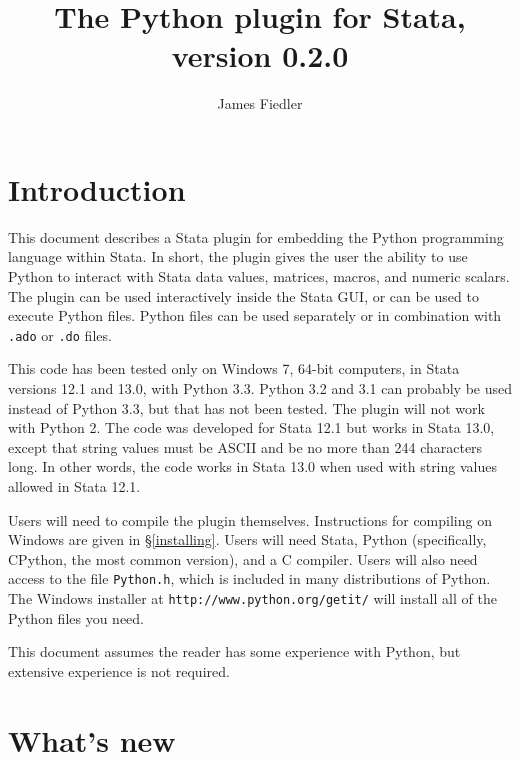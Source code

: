 \documentclass{article}
\title{The Python plugin for Stata, version 0.2.0}
\author{James Fiedler}
\begin{document}
\maketitle
\tableofcontents

\section{Introduction}
		
This document describes a Stata plugin for embedding the Python programming language within Stata. In short, the plugin gives the user the ability to use Python to interact with Stata data values, matrices, macros, and numeric scalars. The plugin can be used interactively inside the Stata GUI, or can be used to execute Python files. Python files can be used separately or in combination with \lstinline{.ado} or \lstinline{.do} files.
		
This code has been tested only on Windows 7, 64-bit computers, in Stata versions 12.1 and 13.0, with Python 3.3. Python 3.2 and 3.1 can probably be used instead of Python 3.3, but that has not been tested. The plugin will not work with Python 2. The code was developed for Stata 12.1 but works in Stata 13.0, except that string values must be \textsc{ASCII} and be no more than 244 characters long. In other words, the code works in Stata 13.0 when used with string values allowed in Stata 12.1.
		
Users will need to compile the plugin themselves. Instructions for compiling on Windows are given in \S\ref{installing}. Users will need Stata, Python (specifically, CPython, the most common version), and a C compiler. Users will also need access to the file \lstinline{Python.h}, which is included in many distributions of Python. The Windows installer at \lstinline{http://www.python.org/getit/} will install all of the Python files you need. 
		
This document assumes the reader has some experience with Python, but extensive experience is not required.



\section{What's new}
\end{document}
